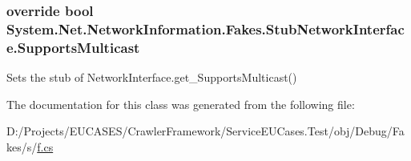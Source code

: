 \hypertarget{class_system_1_1_net_1_1_network_information_1_1_fakes_1_1_stub_network_interface_aa6ca555bd335815d8633377897363a7b}{
\subsubsection[{Supports\-Multicast}]{\setlength{\rightskip}{0pt plus 5cm}override bool System.\-Net.\-Network\-Information.\-Fakes.\-Stub\-Network\-Interface.\-Supports\-Multicast\hspace{0.3cm}{\ttfamily [get]}}}\label{class_system_1_1_net_1_1_network_information_1_1_fakes_1_1_stub_network_interface_aa6ca555bd335815d8633377897363a7b}


Sets the stub of Network\-Interface.\-get\-\_\-\-Supports\-Multicast()



The documentation for this class was generated from the following file\-:\begin{DoxyCompactItemize}
\item 
D\-:/\-Projects/\-E\-U\-C\-A\-S\-E\-S/\-Crawler\-Framework/\-Service\-E\-U\-Cases.\-Test/obj/\-Debug/\-Fakes/s/\hyperlink{s_2f_8cs}{f.\-cs}\end{DoxyCompactItemize}
